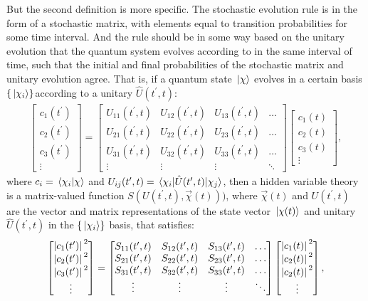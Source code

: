 But the second definition is more specific. The stochastic evolution rule is in the form of a stochastic matrix, with elements equal to transition probabilities for some time interval. And the rule should be in some way based on the unitary evolution that the quantum system evolves according to in the same interval of time, such that the initial and final probabilities of the stochastic matrix and unitary evolution agree. That is, if a quantum state $\ket\chi$ evolves in a certain basis $\{\ket{\chi_i}\}$according to a unitary $\hat U(t^\prime, t)$:
\begin{align}
\left[\begin{matrix}
c_1(t^\prime)\\c_2(t^\prime)\\c_3(t^\prime)\\\vdots
\end{matrix}\right]
= \left[\begin{matrix}
U_{11}(t^\prime, t) & U_{12}(t^\prime, t) & U_{13}(t^\prime, t)&\hdots\\
U_{21}(t^\prime, t) & U_{22}(t^\prime, t) & U_{23}(t^\prime, t)&\hdots\\
U_{31}(t^\prime, t) & U_{32}(t^\prime, t) & U_{33}(t^\prime, t)&\hdots\\
\vdots & \vdots & \vdots & \ddots
\end{matrix}\right]
\left[\begin{matrix}
c_1(t)\\c_2(t)\\c_3(t)\\\vdots
\end{matrix}\right],
\end{align}
where $c_i = \braket{\chi_i}{\chi}$ and $U_{ij}(t^\prime, t) = \matrixel{\chi_i}{\hat U(t^\prime, t)}{\chi_j}$, then a hidden variable theory is a matrix-valued function $S(U(t^\prime, t), \vec\chi(t)))$, where $\vec\chi(t)$ and $U(t^\prime, t)$ are the vector and matrix representations of the state vector $\ket{\chi(t)}$ and unitary $\hat U(t^\prime, t)$ in the $\{\ket{\chi_i}\}$ basis, that satisfies:
\begin{align}
\left[\begin{matrix}
\abs{c_1(t^\prime)}^2\\\abs{c_2(t^\prime)}^2\\\abs{c_3(t^\prime)}^2\\\vdots
\end{matrix}\right]
= \left[\begin{matrix}
S_{11}(t^\prime, t) & S_{12}(t^\prime, t) & S_{13}(t^\prime, t)&\hdots\\
S_{21}(t^\prime, t) & S_{22}(t^\prime, t) & S_{23}(t^\prime, t)&\hdots\\
S_{31}(t^\prime, t) & S_{32}(t^\prime, t) & S_{33}(t^\prime, t)&\hdots\\
\vdots & \vdots & \vdots & \ddots
\end{matrix}\right]
\left[\begin{matrix}
\abs{c_1(t)}^2\\\abs{c_2(t)}^2\\\abs{c_2(t)}^2\\\vdots
\end{matrix}\right],
\end{align}
